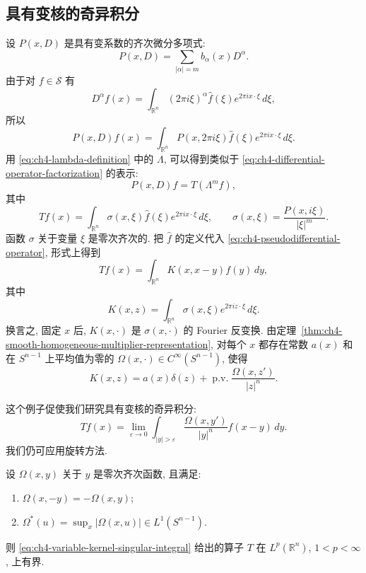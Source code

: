\hypertarget{chapter-04-page-095}{}
\subsection{具有变核的奇异积分}
\label{sec:ch4-variable-kernel-singular-integrals}

设 $P(x,D)$ 是具有变系数的齐次微分多项式:
\[
 P(x,D)=\sum_{|\alpha|=m}b_\alpha(x)D^\alpha.
\]
由于对 $f\in\mathcal S$ 有
\[
 D^\alpha f(x)=\int_{\mathbb R^n}(2\pi i\xi)^\alpha
 \widehat f(\xi)e^{2\pi ix\cdot\xi}\,d\xi,
\]
所以
\[
 P(x,D)f(x)=\int_{\mathbb R^n}P(x,2\pi i\xi)
 \widehat f(\xi)e^{2\pi ix\cdot\xi}\,d\xi.
\]
用 \eqref{eq:ch4-lambda-definition} 中的 $\Lambda$, 可以得到类似于 \eqref{eq:ch4-differential-operator-factorization} 的表示:
\begin{equation}
\label{eq:ch4-variable-differential-factorization}
 P(x,D)f=T(\Lambda^mf),
\end{equation}
其中
\begin{equation}
\label{eq:ch4-pseudodifferential-operator}
 Tf(x)=\int_{\mathbb R^n}\sigma(x,\xi)\widehat f(\xi)
 e^{2\pi ix\cdot\xi}\,d\xi,
 \qquad
 \sigma(x,\xi)=\frac{P(x,i\xi)}{|\xi|^m}.
\end{equation}
函数 $\sigma$ 关于变量 $\xi$ 是零次齐次的. 把 $\widehat f$ 的定义代入 \eqref{eq:ch4-pseudodifferential-operator}, 形式上得到
\begin{equation}
\label{eq:ch4-variable-kernel-representation}
 Tf(x)=\int_{\mathbb R^n}K(x,x-y)f(y)\,dy,
\end{equation}
其中
\begin{equation}
\label{eq:ch4-variable-kernel-inverse-fourier}
 K(x,z)=\int_{\mathbb R^n}\sigma(x,\xi)e^{2\pi iz\cdot\xi}\,d\xi.
\end{equation}
换言之, 固定 $x$ 后, $K(x,\cdot)$ 是 $\sigma(x,\cdot)$ 的 Fourier 反变换. 由定理~\ref{thm:ch4-smooth-homogeneous-multiplier-representation}, 对每个 $x$ 都存在常数 $a(x)$ 和在 $S^{n-1}$ 上平均值为零的 $\Omega(x,\cdot)\in C^\infty(S^{n-1})$, 使得
\[
 K(x,z)=a(x)\delta(z)+\operatorname{p.v.}
 \frac{\Omega(x,z')}{|z|^n}.
\]

\hypertarget{chapter-04-page-096}{}
这个例子促使我们研究具有变核的奇异积分:
\begin{equation}
\label{eq:ch4-variable-kernel-singular-integral}
 Tf(x)=\lim_{\varepsilon\to0}\int_{|y|>\varepsilon}
 \frac{\Omega(x,y')}{|y|^n}f(x-y)\,dy.
\end{equation}
我们仍可应用旋转方法.

\begin{Theorem}
\label{thm:ch4-variable-odd-kernel-lp}
设 $\Omega(x,y)$ 关于 $y$ 是零次齐次函数, 且满足:
\begin{enumerate}
\item $\Omega(x,-y)=-\Omega(x,y)$;
\item $\Omega^*(u)=\sup_x|\Omega(x,u)|\in L^1(S^{n-1})$.
\end{enumerate}
则 \eqref{eq:ch4-variable-kernel-singular-integral} 给出的算子 $T$ 在 $L^p(\mathbb R^n)$, $1<p<\infty$, 上有界.
\end{Theorem}

